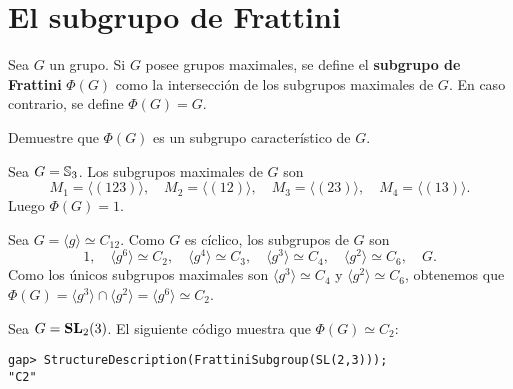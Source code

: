 \chapter{El subgrupo de Frattini}

\begin{definition}
	Sea $G$ un grupo. Si $G$ posee grupos maximales, se define el
	\textbf{subgrupo de Frattini} $\Phi(G)$ como la intersección de los
	subgrupos maximales de $G$. En caso contrario, se define $\Phi(G)=G$.
\end{definition}

\begin{exercise}
	Demuestre que $\Phi(G)$ es un subgrupo característico de $G$.
\end{exercise}


\begin{example}
	Sea $G=\mathbb{S}_3$.  Los subgrupos maximales de $G$ son 
	\[
	M_1=\langle (123)\rangle,
	\quad
	M_2=\langle (12)\rangle,
	\quad
	M_3=\langle (23)\rangle,
	\quad
	M_4=\langle (13)\rangle.
	\]
	Luego
	$\Phi(G)=1$. 
\end{example}

\begin{example}
	Sea $G=\langle g\rangle\simeq C_{12}$. Como $G$ es cíclico, los subgrupos de $G$ son 
	\[
	1,\quad
	\langle g^6\rangle\simeq C_2,\quad
	\langle g^4\rangle\simeq C_3,\quad
	\langle g^3\rangle\simeq C_4,\quad
	\langle g^2\rangle\simeq C_6,\quad
	G.
	\]
	Como los únicos subgrupos maximales son $\langle g^3\rangle\simeq C_4$ y $\langle
	g^2\rangle\simeq C_6$, obtenemos que $\Phi(G)=\langle g^3\rangle\cap \langle
	g^2\rangle=\langle g^6\rangle\simeq C_2$.
\end{example}

\begin{example}
	Sea $G=\mathbf{SL}_2(3)$. El siguiente código muestra que $\Phi(G)\simeq C_2$: 
\begin{lstlisting}
gap> StructureDescription(FrattiniSubgroup(SL(2,3)));
"C2"
\end{lstlisting}
\end{example}

